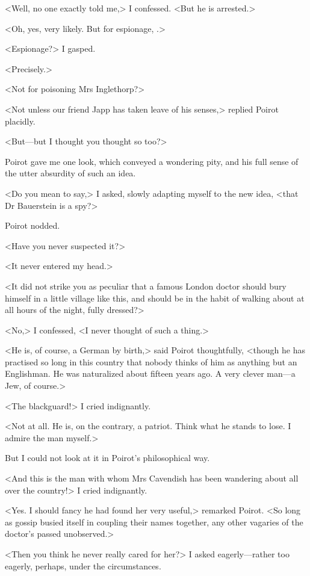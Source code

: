  <Well, no one exactly told me,> I confessed. <But he is arrested.> 

 <Oh, yes, very likely. But for espionage, .> 

 <Espionage?> I gasped. 

 <Precisely.> 

 <Not for poisoning Mrs Inglethorp?> 

 <Not unless our friend Japp has taken leave of his senses,> replied Poirot placidly. 

 <But—but I thought you thought so too?> 

 Poirot gave me one look, which conveyed a wondering pity, and his full sense of the utter absurdity of such an idea. 

 <Do you mean to say,> I asked, slowly adapting myself to the new idea, <that Dr Bauerstein is a spy?> 

 Poirot nodded. 

 <Have you never suspected it?> 

 <It never entered my head.> 

 <It did not strike you as peculiar that a famous London doctor should bury himself in a little village like this, and should be in the habit of walking about at all hours of the night, fully dressed?> 

 <No,> I confessed, <I never thought of such a thing.> 

 <He is, of course, a German by birth,> said Poirot thoughtfully, <though he has practised so long in this country that nobody thinks of him as anything but an Englishman. He was naturalized about fifteen years ago. A very clever man—a Jew, of course.> 

 <The blackguard!> I cried indignantly. 

 <Not at all. He is, on the contrary, a patriot. Think what he stands to lose. I admire the man myself.> 

 But I could not look at it in Poirot's philosophical way. 

 <And this is the man with whom Mrs Cavendish has been wandering about all over the country!> I cried indignantly. 

 <Yes. I should fancy he had found her very useful,> remarked Poirot. <So long as gossip busied itself in coupling their names together, any other vagaries of the doctor's passed unobserved.> 

 <Then you think he never really cared for her?> I asked eagerly—rather too eagerly, perhaps, under the circumstances. 

